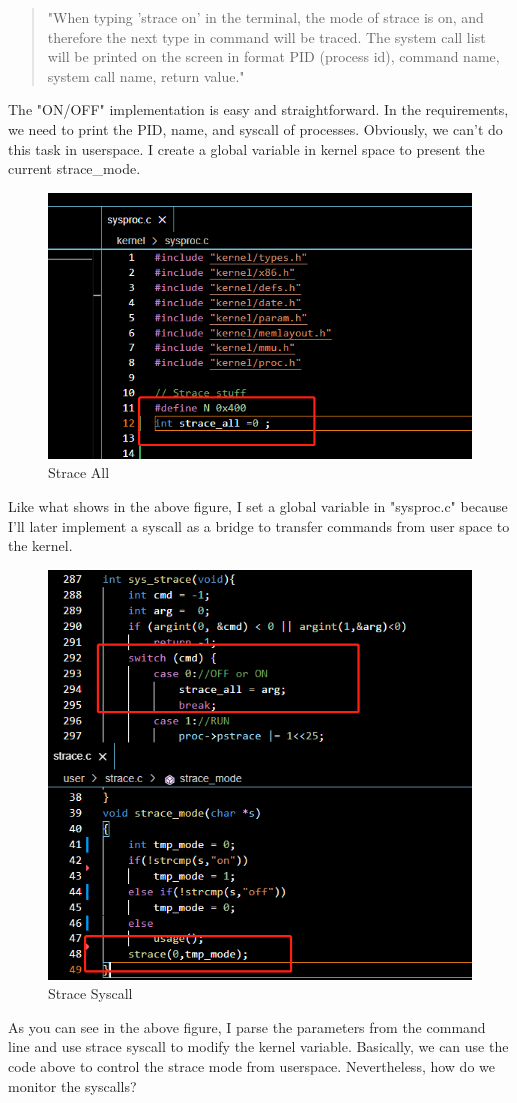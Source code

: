 \documentclass[11pt,oneside,a4paper]{article}
\begin{document}
\begin{quotation}
    "When typing 'strace on' in the terminal, the mode of strace is on, and therefore the next type in
command will be traced. The system call list will be printed on the screen in format PID (process id),
command name, system call name, return value."
\end{quotation}
The "ON/OFF" implementation is easy and straightforward. In the requirements, we need
to print the PID, name, and syscall of processes. Obviously, we can't do this task
in userspace. I create a global variable in kernel space to present the current 
strace\_mode.
\begin{figure}[H]
    \includegraphics[width=4.75in]{1-5.png}
    \centering
    \caption{Strace All}
\end{figure}
Like what shows in the above figure, I set a global variable in "sysproc.c" because I'll
later implement a syscall as a bridge to transfer commands from user space to the kernel.

\begin{figure}[H]
    \includegraphics[width=4.75in]{1-6.png}
    \centering
    \caption{Strace Syscall}
\end{figure}
As you can see in the above figure, I parse the parameters from the command line and 
use strace syscall to modify the kernel variable. Basically, we can use the code above
to control the strace mode from userspace. Nevertheless, how do we monitor the 
syscalls?
\end{document}
